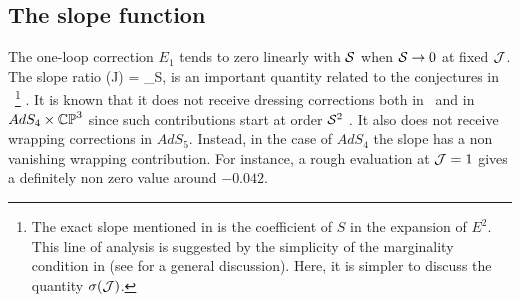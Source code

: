 \subsection{The slope function}
\label{sec:slope}

The one-loop correction $E_{1}$ tends to zero linearly with $\mathcal S$ when $\mathcal S\to 0$ at fixed $\mathcal J$.
The slope ratio
\beq
\sigma(\mc J) = \lim_{\mc S},
\eeq
is an important quantity  related to the conjectures in \cite{Basso:2011rs}~\footnote{The exact slope mentioned in 
\cite{Basso:2011rs} is the coefficient of $S$ in the expansion of $E^{2}$. This line of analysis is suggested by the simplicity of the marginality condition in \ads (see \cite{Tseytlin:2003ac} for a general discussion). Here, it is simpler to discuss the quantity $\sigma(\mathcal J)$.} . It is known that it does not receive dressing corrections both in \ads\ and in $AdS_{4}\times \mathbb{CP}^{3}$ since such contributions start at 
order $\mathcal S^{2}$ \cite{Basso:2011rs}. It also 
does not receive wrapping corrections in $AdS_{5}$.  Instead, in the case of $AdS_{4}$ the slope has a non vanishing wrapping contribution. For instance, a rough evaluation at $\mathcal J=1$ gives  a definitely non zero value around $-0.042$.

